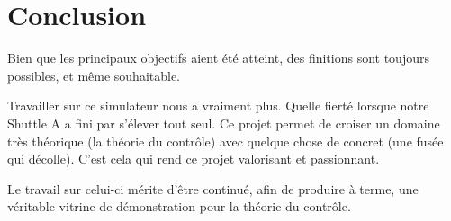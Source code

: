 \documentclass[a4paper,11pt]{article}
\begin{document}
\section{Conclusion}
    Bien que les principaux objectifs aient été atteint, des finitions sont toujours possibles, et même souhaitable.
        
    Travailler sur ce simulateur nous a vraiment plus. Quelle fierté lorsque notre Shuttle A a fini par s'élever tout seul. 
    Ce projet permet de croiser un domaine très théorique (la théorie du contrôle) avec quelque chose de concret (une fusée qui décolle). C'est cela qui rend ce projet valorisant et passionnant.
    
    Le travail sur celui-ci mérite d'être continué, afin de produire à terme, une véritable vitrine de démonstration pour la théorie du contrôle.
\end{document}
